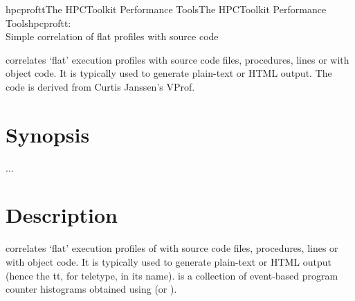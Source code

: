 \documentclass[english]{article}
\begin{document}
\begin{Name}{1}{hpcproftt}{The HPCToolkit Performance Tools}{The HPCToolkit Performance Tools}{hpcproftt:\\ Simple correlation of flat profiles with source code}

 correlates `flat' execution profiles with source code files, procedures, lines or with object code.
It is typically used to generate plain-text or HTML output.
The code is derived from Curtis Janssen's VProf.

\end{Name}

\section{Synopsis}

   ...

\section{Description}

 correlates `flat' execution profiles of  with source code files, procedures, lines or with object code.
It is typically used to generate plain-text or HTML output (hence the tt, for teletype, in its name).
 is a collection of event-based program counter histograms obtained using  (or ).
\end{document}
